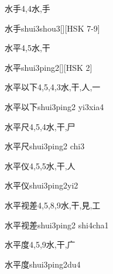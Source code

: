 \begin{Entry}{水手}{4,4}{⽔,⼿}
  \begin{Phonetics}{水手}{shui3shou3}[][HSK 7-9]
  \end{Phonetics}
\end{Entry}

\begin{Entry}{水平}{4,5}{⽔,⼲}
  \begin{Phonetics}{水平}{shui3ping2}[][HSK 2]
  \end{Phonetics}
\end{Entry}

\begin{Entry}{水平以下}{4,5,4,3}{⽔,⼲,⼈,⼀}
  \begin{Phonetics}{水平以下}{shui3ping2 yi3xia4}
  \end{Phonetics}
\end{Entry}

\begin{Entry}{水平尺}{4,5,4}{⽔,⼲,⼫}
  \begin{Phonetics}{水平尺}{shui3ping2 chi3}
  \end{Phonetics}
\end{Entry}

\begin{Entry}{水平仪}{4,5,5}{⽔,⼲,⼈}
  \begin{Phonetics}{水平仪}{shui3ping2yi2}
  \end{Phonetics}
\end{Entry}

\begin{Entry}{水平视差}{4,5,8,9}{⽔,⼲,⾒,⼯}
  \begin{Phonetics}{水平视差}{shui3ping2 shi4cha1}
  \end{Phonetics}
\end{Entry}

\begin{Entry}{水平度}{4,5,9}{⽔,⼲,⼴}
  \begin{Phonetics}{水平度}{shui3ping2du4}
  \end{Phonetics}
\end{Entry}


